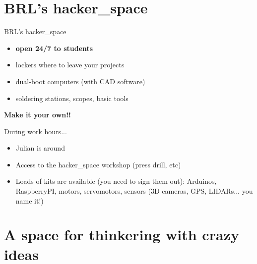 \documentclass[compress]{beamer}
\begin{document}
\section[hacker\_space]{BRL's hacker\_space}



\begin{frame}{BRL's hacker\_space}

    \begin{itemize}
        \item \textbf{open 24/7 to students}
        \item lockers where to leave your projects
        \item dual-boot computers (with CAD software)
        \item soldering stations, scopes, basic tools
    \end{itemize}

    \begin{center}
        \Large
        \textbf{Make it your own!!}
    \end{center}

\end{frame}


\begin{frame}{During work hours...}
    \begin{itemize}
        \item Julian is around
        \item Access to the hacker\_space workshop (press drill, etc)
        \item Loads of kits are available (you need to sign them out): Arduinos,
            RaspberryPI, motors, servomotors, sensors (3D cameras, GPS, LIDARs... you name
            it!)
    \end{itemize}
\end{frame}


\section{A space for thinkering with crazy ideas}

\end{document}
